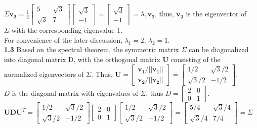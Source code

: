 \documentclass[a4paper]{article}
\begin{document}
\begin{spacing}{2.0}
	$\Sigma \mathbf{v_2} = \displaystyle\frac{1}{4}\left[ \begin{matrix} 5 & \sqrt{3} \\  \sqrt{3} & 7\end{matrix}\right]\left[ \begin{matrix} \sqrt{3} \\  -1 			\end{matrix}\right] = \left[ \begin{matrix} \sqrt{3} \\  -1 \end{matrix}\right] = \lambda_1\mathbf{v_2}$, thus, $\mathbf{v_2}$ is the eigenvector of $			\Sigma$ with the corresponding eigenvalue 1.\\
	
	For convenience of the later discussion, $\lambda_1 = 2$, $\lambda_2 = 1$.\\
	
	\noindent	
	\textbf{1.3} 
	Based on the spectral theorem,  the symmetric matrix $\Sigma$ can be diagonalized into diagonal matrix D, with the orthogonal matrix  $\mathbf{U}		$ consisting of the normalized eigenvectors of $\Sigma$. Thus, $\mathbf{U} = \left[ \begin{matrix} \mathbf{v_1}/||\mathbf{v_1}||\\ \mathbf{v_2}/||\mathbf{v_2}||\end{matrix}				\right]=\left[ \begin{matrix} 1/2 & \sqrt{3}/2 \\ \sqrt{3}/2 & -1/2 \end{matrix}\right]$.\\
	$D$ is the diagonal matrix with eigenvalues of $\Sigma$, thus $D = \left[ \begin{matrix} 2 & 0 \\ 0 & 1 \end{matrix}\right]$.\\
	$\mathbf{UDU}^T = \left[ \begin{matrix} 1/2 & \sqrt{3}/2 \\ \sqrt{3}/2 & -1/2 \end{matrix}\right] \left[ \begin{matrix} 2 & 0 \\ 0 & 1 \end{matrix}\right] \left[ \begin{matrix} 1/2 & \sqrt{3}/2 \\ \sqrt{3}/2 & -1/2 \end{matrix}\right] = \left[ \begin{matrix} 5/4 & \sqrt{3}/4 \\ \sqrt{3}/4 & 7/4\end{matrix} \right] = \Sigma$\\
	

\end{spacing}
\end{document}
